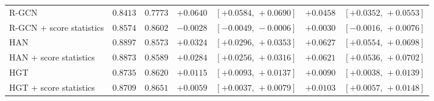 \begin{table}[t]
\begin{tabular}{@{}lrrrrrr@{}}
R-GCN & $0.8413$ & $0.7773$ & $+0.0640$ & $[+0.0584,\,+0.0690]$ & $+0.0458$ & $[+0.0352,\,+0.0553]$ \\
R-GCN + score statistics & $0.8574$ & $0.8602$ & $-0.0028$ & $[-0.0049,\,-0.0006]$ & $+0.0030$ & $[-0.0016,\,+0.0076]$ \\
HAN & $0.8897$ & $0.8573$ & $+0.0324$ & $[+0.0296,\,+0.0353]$ & $+0.0627$ & $[+0.0554,\,+0.0698]$ \\
HAN + score statistics & $0.8873$ & $0.8589$ & $+0.0284$ & $[+0.0256,\,+0.0316]$ & $+0.0621$ & $[+0.0536,\,+0.0702]$ \\
HGT & $0.8735$ & $0.8620$ & $+0.0115$ & $[+0.0093,\,+0.0137]$ & $+0.0090$ & $[+0.0038,\,+0.0139]$ \\
HGT + score statistics & $0.8709$ & $0.8651$ & $+0.0059$ & $[+0.0037,\,+0.0079]$ & $+0.0103$ & $[+0.0057,\,+0.0148]$ \\
\bottomrule
\end{tabular}
\end{table}
